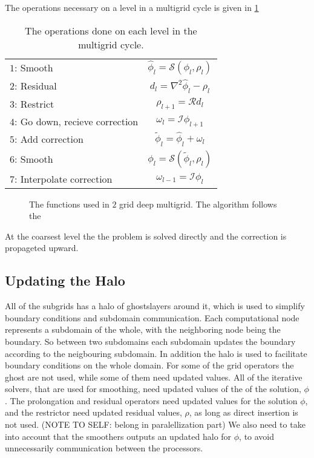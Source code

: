		The operations necessary on a level in a multigrid cycle is given in \cref{tab:recursive}
		\begin{table}[h]
		\begin{tabular}	{l | c}
			\(1\): Smooth &\( \widehat{\phi}_l = \mathcal{S}(\phi_l, \rho_l)\)
			\\
			\(2\): Residual &	\(d_l = \nabla^2\widehat{\phi}_l - \rho_l\)
			\\
			\(3\): Restrict &\(\rho_{l+1} = \mathcal{R}d_l \) \nonumber
			\\
			\(4\): Go down, recieve correction & \(\omega_l = \mathcal{I} \phi_{l+1}\)
			\\
			\(5\): Add correction	&\(\widetilde{\phi}_l = \widehat{\phi}_l + \omega_l\)
			\\
			\(6\): Smooth	&\(\phi_l = \mathcal{S}(\widetilde{\phi}_l, \rho_l)\)
			\\
			\(7\): Interpolate correction &\( \omega_{l-1} = \mathcal{I} \phi_l\)
		\end{tabular}
		\caption{The operations done on each level in the multigrid cycle.}
		\label{tab:recursive}
		\end{table}

		\begin{figure}
			\centering
			
			\caption{The functions used in \(2\) grid deep multigrid. The algorithm follows the }
		\end{figure}

		At the coarsest level the the problem is solved directly and the correction is propageted upward.

		\subsection{Updating the Halo}
		All of the subgrids has a halo of ghostslayers around it, which is used to simplify boundary conditions and subdomain communication. Each computational node
		represents a subdomain of the whole, with the neighboring node being the boundary. So between two subdomains each subdomain updates the boundary according to
		the neigbouring subdomain. In addition the halo is used to facilitate boundary conditions on the whole domain. For some of the grid operators
		the ghost are not used, while some of them need updated values. All of the iterative solvers, that are used
		for smoothing, need updated values of the of the solution, \(\phi\). The prolongation and residual operators need updated values
		for the solution \(\phi\), and the restrictor need updated residual values, \(\rho\), as long as direct insertion is not used. (NOTE TO SELF: belong in paralellization part)
		We also need to take into account that the smoothers outputs an updated halo for \(\phi\), to avoid
		unnecessarily communication between the processors.

